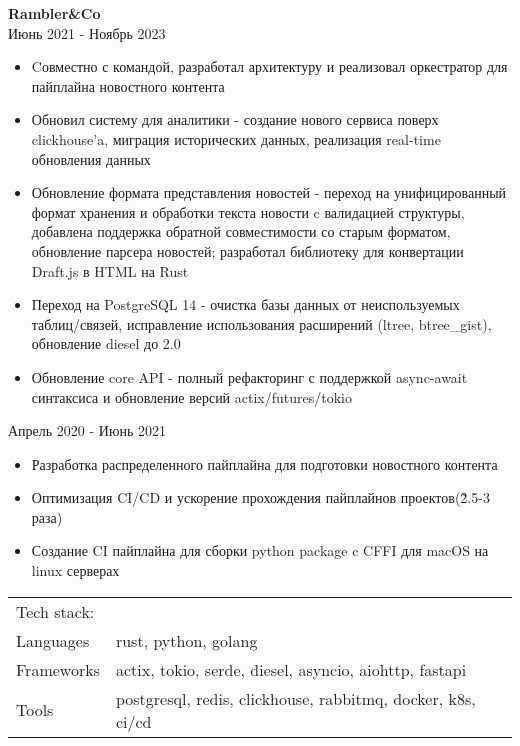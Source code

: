 \documentclass[a4paper]{article}
\begin{document}
\textbf{Rambler\&Co} \\
 \hfill Июнь 2021 - Ноябрь 2023\\
\vspace{-1mm}
\begin{itemize}[leftmargin=16pt,itemsep=0pt,topsep=2pt,label={-}]
    \item Cовместно с командой, разработал архитектуру и реализовал оркестратор для пайплайна новостного контента
    \item Обновил систему для аналитики - создание нового сервиса поверх clickhouse'a, миграция исторических данных, реализация real-time обновления данных
    \item Обновление формата представления новостей - переход на унифицированный формат хранения и обработки текста новости c валидацией структуры, добавлена поддержка обратной совместимости со старым форматом, обновление парсера новостей; разработал библиотеку для конвертации Draft.js в HTML на Rust
    \item Переход на PostgreSQL 14 - очистка базы данных от неиспользуемых таблиц/связей, исправление использования расширений (ltree, btree\_gist), обновление diesel до 2.0
    \item Обновление core API - полный рефакторинг с поддержкой async-await синтаксиса и обновление версий actix/futures/tokio
\end{itemize}
 \hfill Апрель 2020 - Июнь 2021\\
\begin{itemize}[leftmargin=16pt,itemsep=0pt,topsep=-8pt,label={-}]
    \item Разработка распределенного пайплайна для подготовки новостного контента
    \item Оптимизация CI/CD и ускорение прохождения пайплайнов проектов(\~2.5-3 раза)
    \item Создание CI пайплайна для сборки python package c CFFI для macOS на linux серверах
\end{itemize}
\begin{table}[h!]
    \begin{tabular}{ l l }
        Tech stack:& \\
        Languages  & rust, python, golang \\
        Frameworks & actix, tokio, serde, diesel, asyncio, aiohttp, fastapi \\
        Tools      & postgresql, redis, clickhouse, rabbitmq, docker, k8s, ci/cd \\
    \end{tabular}
\end{table}
\end{document}
